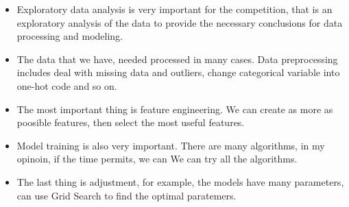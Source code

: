\begin{itemize}
	\item Exploratory data analysis is 
	very important for the competition,
	that is an exploratory analysis 
	of the data to 
	provide the necessary conclusions 
	for data processing and modeling. 
	\item The data that we have,
	needed processed in many cases.
	Data preprocessing includes 
	deal with missing data and outliers,
	change categorical variable 
	into one-hot code and so on.
	\item The most important thing is
	feature engineering.
	We can create as more as poosible features,
	then select the most useful features.
	\item Model training is also very important.
	There are many algorithms, 
	in my opinoin, 
	if the time permits,
	we can We can try all the algorithms. 
	\item The last thing is adjustment,
	for example,
	the models have many parameters,
	can use Grid Search to find 
	the optimal paratemers.	
\end{itemize}











